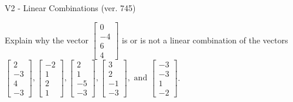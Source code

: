 \begin{exercise}
  \begin{exerciseTitle}V2 - Linear Combinations (ver. 745)\end{exerciseTitle}
  \begin{exerciseStatement}
    Explain why the vector \(\left[\begin{array}{c}
0 \\
-4 \\
6 \\
4
\end{array}\right]\)  is or is not a linear 
	combination of the vectors \(\left[\begin{array}{c}
2 \\
-3 \\
4 \\
-3
\end{array}\right] , \left[\begin{array}{c}
-2 \\
1 \\
2 \\
1
\end{array}\right] , \left[\begin{array}{c}
2 \\
1 \\
-5 \\
-3
\end{array}\right] , \left[\begin{array}{c}
3 \\
2 \\
-1 \\
-3
\end{array}\right] , \text{ and } \left[\begin{array}{c}
-3 \\
-3 \\
1 \\
-2
\end{array}\right]\).
	



\end{exerciseStatement}
\end{exercise}
